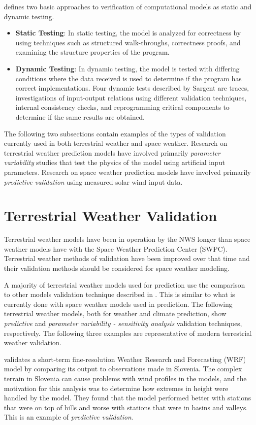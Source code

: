\citet{Sargent2004} defines two basic approaches to verification of
computational models as static and dynamic testing.
\begin{itemize}
 \item \textbf{Static Testing}:  In static testing, the model is
 analyzed for correctness by using techniques such as structured walk-throughs,
 correctness proofs, and examining the structure properties of the program.
 \item \textbf{Dynamic Testing}: In dynamic testing, the model is
 tested with differing conditions where the data received is used to determine
 if the program has correct implementations. Four dynamic tests described by
 Sargent are traces, investigations of input-output relations using different
 validation techniques, internal consistency checks, and reprogramming critical
 components to determine if the same results are obtained.
\end{itemize}

The following two subsections contain examples of the types of validation currently
used in both terrestrial weather and space weather. Research on terrestrial
weather prediction models have involved primarily \textit{parameter variability} studies
that test the physics of the model using artificial input parameters. Research
on space weather prediction models have involved primarily \textit{predictive
validation} using measured solar wind input data.
\section{Terrestrial Weather Validation}
Terrestrial weather models have been in operation by the NWS longer than space
weather models have with the Space Weather Prediction Center (SWPC). Terrestrial
weather methods of validation have been improved over that time and their validation methods
should be considered for space weather modeling.

A majority of terrestrial weather models used for prediction use the comparison
to other models validation technique described in \citep{Sargent2004}. This is
similar to what is currently done with space weather models used in prediction. The
following terrestrial weather models, both for weather and climate prediction,
show \textit{predictive} and \textit{parameter variability - sensitivity
analysis} validation techniques, respectively. The following three examples are representative of
modern terrestrial weather validation.

\citet{Boznar2012} validates a short-term fine-resolution Weather Research
and Forecasting (WRF) model by comparing its output to observations made in
Slovenia. The complex terrain in Slovenia can cause problems with wind profiles
in the models, and the motivation for this analysis was to determine how
extremes in height were handled by the model. They found that the model
performed better with stations that were on top of hills and worse with
stations that were in basins and valleys. This is an example of
\textit{predictive validation}.


